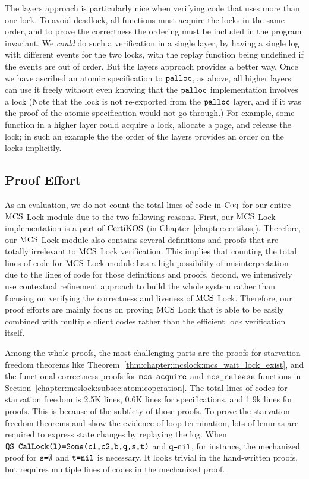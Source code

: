 The layers approach is particularly nice when verifying code that uses more than one
lock. To avoid deadlock, all functions must acquire the locks in the
same order, and to prove the correctness the ordering must be
included in the program invariant. We \emph{could} do such a
verification in a single layer, by having a single log with different
events for the two locks, with the replay function being undefined if
the events are out of order. But the layers approach provides a
better way. Once we have ascribed an atomic specification to
${\mathrm{\texttt{palloc}}}$, as above, all higher layers can use it
freely without even knowing that the ${\mathrm{\texttt{palloc}}}$ implementation
involves a lock (Note that the lock is not re-exported from the
${\mathrm{\texttt{palloc}}}$ layer, and if it was the proof of the atomic
specification would not go through.)  For example, some function in a
higher layer could acquire a lock, allocate a page, and release the
lock; in such an example the the order of the layers provides an order
on the locks implicitly.

\subsection{Proof Effort}


As an evaluation, we do not count the total lines of code in $\mathrm{Coq}$ for our entire 
$\mathrm{MCS}$ Lock module due to the two following reasons. First, our $\mathrm{MCS}$ Lock implementation 
is a part of $\mathrm{CertiKOS}$ (in Chapter~\ref{chapter:certikos}). Therefore, our $\mathrm{MCS}$ Lock module also contains several definitions 
and proofs that are totally irrelevant to $\mathrm{MCS}$ Lock verification. 
This implies that counting the total lines of code for $\mathrm{MCS}$ Lock module has a 
high possibility of misinterpretation due to the lines of code for those definitions and proofs.
Second, we intensively use contextual refinement approach to 
build the whole system rather than focusing on verifying the correctness and 
liveness of $\mathrm{MCS}$ Lock. Therefore, our proof efforts are mainly focus on proving 
$\mathrm{MCS}$ Lock that is able to be easily combined with multiple client codes 
rather than the efficient lock verification itself.  

Among the whole proofs, the most challenging parts are the proofs for starvation 
freedom theorems like Theorem~\ref{thm:chapter:mcslock:mcs_wait_lock_exist}, 
and the functional correctness proofs for ${\mathrm{\texttt{mcs\_acquire}}}$ 
and ${\mathrm{\texttt{mcs\_release}}}$ functions
in Section~\ref{chapter:mcslock:subsec:atomicoperation}.
The total lines of codes for starvation freedom is 2.5K lines, 0.6K lines for specifications, 
and 1.9k lines for proofs. This is because of the subtlety of those proofs. 
To prove the starvation freedom theorems and show the evidence of loop termination,
lots of lemmas are required to express
state changes by replaying the log. 
When ${\mathrm{\texttt{QS\_CalLock}}}{\mathrm{\texttt{(l)=}}}{\mathrm{\texttt{Some}}}{\mathrm{\texttt{(c1,c2,b,q,s,t)}}}$
and ${\mathrm{\texttt{q=}}}{\mathrm{\texttt{nil}}}$, 
for instance, the mechanized proof for ${\mathrm{\texttt{s=}}}\emptyset$ 
and ${\mathrm{\texttt{t=}}}{\mathrm{\texttt{nil}}}$ is necessary. It looks trivial in the hand-written proofs, 
but requires multiple lines of codes in the mechanized proof. 

